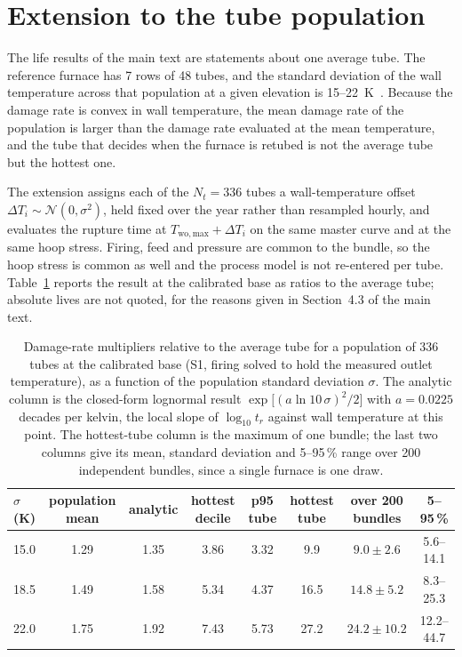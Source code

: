 \documentclass[final,3p,times]{elsarticle}
\begin{document}
\section{Extension to the tube population}
\label{sec:population}

The life results of the main text are statements about one average tube. The reference
furnace has 7 rows of 48 tubes, and the standard deviation of the wall temperature across
that population at a given elevation is 15--22~K~\cite{latham2011}. Because the damage
rate is convex in wall temperature, the mean damage rate of the population is larger than
the damage rate evaluated at the mean temperature, and the tube that decides when the
furnace is retubed is not the average tube but the hottest one.

The extension assigns each of the $N_t = 336$ tubes a wall-temperature offset
$\Delta T_i \sim \mathcal{N}(0, \sigma^2)$, held fixed over the year rather than resampled
hourly, and evaluates the rupture time at $T_{\mathrm{wo,max}} + \Delta T_i$ on the same
master curve and at the same hoop stress. Firing, feed and pressure are common to the
bundle, so the hoop stress is common as well and the process model is not re-entered per
tube. Table~\ref{tab:population} reports the result at the calibrated base as ratios to
the average tube; absolute lives are not quoted, for the reasons given in Section~4.3 of
the main text.

\begin{table}[h]
\centering\footnotesize
\caption{Damage-rate multipliers relative to the average tube for a population of 336
tubes at the calibrated base (S1, firing solved to hold the measured outlet temperature),
as a function of the population standard deviation $\sigma$.
The analytic column is the closed-form lognormal result
$\exp\!\big[(a\ln 10\,\sigma)^2/2\big]$ with $a = 0.0225$ decades per kelvin, the local
slope of $\log_{10} t_r$ against wall temperature at this point. The hottest-tube column
is the maximum of one bundle; the last two columns give its mean, standard deviation and
5--95\,\% range over 200 independent bundles, since a single furnace is one draw.}
\label{tab:population}
\begin{tabular}{lccccccc}
\toprule
$\sigma$ (K) & population mean & analytic & hottest decile & p95 tube & hottest tube & over 200 bundles & 5--95\,\% \\
\midrule
15.0 & 1.29 & 1.35 & 3.86 & 3.32 & 9.9  & $9.0 \pm 2.6$  & 5.6--14.1 \\
18.5 & 1.49 & 1.58 & 5.34 & 4.37 & 16.5 & $14.8 \pm 5.2$ & 8.3--25.3 \\
22.0 & 1.75 & 1.92 & 7.43 & 5.73 & 27.2 & $24.2 \pm 10.2$ & 12.2--44.7 \\
\bottomrule
\end{tabular}
\end{table}
\end{document}
